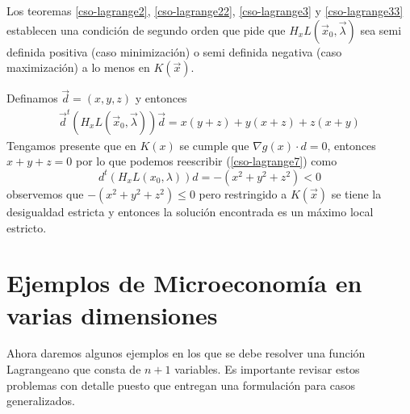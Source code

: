 \begin{solucion}
Los teoremas \ref{cso-lagrange2}, \ref{cso-lagrange22}, \ref{cso-lagrange3} y \ref{cso-lagrange33} establecen una condici\'on de segundo orden que pide que $H_x L(\vec{x}_0,\vec{\lambda})$ sea semi definida positiva (caso minimizaci\'on) o semi definida negativa (caso maximizaci\'on) a lo menos en $K(\vec{x})$.

Definamos $\vec{d}=(x,y,z)$ y entonces 
\begin{gather}\label{cso-lagrange7}
\vec{d}^t (H_x L(\vec{x}_0,\vec{\lambda}))\vec{d} = x(y+z)+y(x+z)+z(x+y) \tag{*}
\end{gather}
Tengamos presente que en $K(x)$ se cumple que $\nabla g(x)\cdot d = 0$, entonces $x+y+z=0$ por lo que podemos reescribir (\ref{cso-lagrange7}) como
$$d^t (H_x L(x_0,\lambda)) d = -(x^2+y^2+z^2)<0$$
observemos que $-(x^2+y^2+z^2)\leq 0$ pero restringido a $K(\vec{x})$ se tiene la desigualdad estricta y entonces la soluci\'on encontrada es un m\'aximo local estricto.
\end{solucion}

\section{Ejemplos de Microeconom\'ia en varias dimensiones}\label{ejemplos-variasdimensiones}

Ahora daremos algunos ejemplos en los que se debe resolver una funci\'on Lagrangeano que consta de $n+1$ variables. Es importante revisar estos problemas con detalle puesto que entregan una formulaci\'on para casos generalizados.

